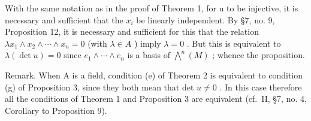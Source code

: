 With the same notation as in the proof of Theorem 1, for u to be injective, it is necessary and sufficient that the \(x_{i}\) be linearly independent. By §7, no. 9, Proposition 12, it is necessary and sufficient for this that the relation \(\lambda x_{1} \wedge x_{2} \wedge \cdots \wedge x_{n} = 0\) (with \(\lambda \in A\) ) imply \(\lambda = 0\) . But this is equivalent to \(\lambda(\det u) = 0\) since \(e_{1} \wedge \cdots \wedge e_{n}\) is a basis of \(\bigwedge^{n}(M)\) ; whence the proposition.

Remark. When A is a field, condition (e) of Theorem 2 is equivalent to condition (g) of Proposition 3, since they both mean that det \(u \neq 0\) . In this case therefore all the conditions of Theorem 1 and Proposition 3 are equivalent (cf.~II, §7, no. 4, Corollary to Proposition 9).

